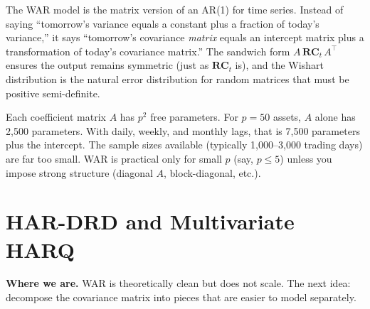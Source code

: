 \begin{intuition}
The WAR model is the matrix version of an AR(1) for time series. Instead of
saying ``tomorrow's variance equals a constant plus a fraction of today's
variance,'' it says ``tomorrow's covariance \emph{matrix} equals an intercept
matrix plus a transformation of today's covariance matrix.'' The sandwich
form $A\,\mathbf{RC}_t\,A^\top$ ensures the output remains symmetric (just as
$\mathbf{RC}_t$ is), and the Wishart distribution is the natural error
distribution for random matrices that must be positive semi-definite.
\end{intuition}

\begin{warning}
Each coefficient matrix $A$ has $p^2$ free parameters. For $p = 50$ assets,
$A$ alone has 2{,}500 parameters. With daily, weekly, and monthly lags, that
is 7{,}500 parameters plus the intercept. The sample sizes available
(typically 1{,}000--3{,}000 trading days) are far too small. WAR is practical
only for small $p$ (say, $p \leq 5$) unless you impose strong structure
(diagonal $A$, block-diagonal, etc.).
\end{warning}


\section{HAR-DRD and Multivariate HARQ}\label{sec:multivariate:drd}

\textbf{Where we are.}  WAR is theoretically clean but does not scale. The next
idea: decompose the covariance matrix into pieces that are easier to model
separately.

